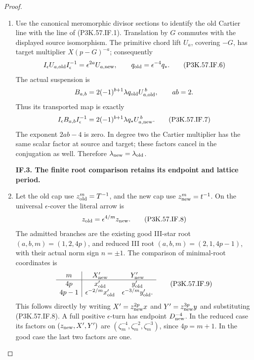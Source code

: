 \begin{proof}
\begin{enumerate}[label=\arabic*.]
\par\medskip\noindent\textbf{IF.2. The complete suspension keeps the scalar.}\par\nopagebreak[4]

\item Use the canonical meromorphic divisor sections to identify the old Cartier
line with the line of (P3K.57.IF.1). Translation by \(G\) commutes with the displayed
source isomorphism. The primitive chord lift \(U_a\), covering \(-G\), has
target multiplier \(X(p-G)^{-a}\); consequently
\[
 I_\epsilon U_{a,\rm old}I_\epsilon^{-1}
       =\epsilon^{2a}U_{a,\rm new},\qquad
 q_{\rm old}=\epsilon^{-4}q_* .                         \tag{P3K.57.IF.6}
\]
The actual suspension is
\[
 B_{a,b}=2(-1)^{b+1}\lambda q_{\rm old}U_{a,\rm old}^{\,b},
 \qquad ab=2 .
\]
Thus its transported map is exactly
\[
 I_\epsilon B_{a,b}I_\epsilon^{-1}
       =2(-1)^{b+1}\lambda q_*U_{a,\rm new}^{\,b}.       \tag{P3K.57.IF.7}
\]
The exponent \(2ab-4\) is zero. In degree two the Cartier multiplier has the
same scalar factor at source and target; these factors cancel in the
conjugation as well. Therefore \(\lambda_{\rm new}=\lambda_{\rm old}\).

\par\medskip\noindent\textbf{IF.3. The finite root comparison retains its endpoint and lattice period.}\par\nopagebreak[4]

\item Let the old cap use \(z_{\rm old}^m=T^{-1}\), and the new cap use
\(z_{\rm new}^m=t^{-1}\). On the universal \(\epsilon\)-cover the literal arrow is
\[
 z_{\rm old}=\epsilon^{4/m}z_{\rm new}.                 \tag{P3K.57.IF.8}
\]
The admitted branches are the existing good III-star root
\((a,b,m)=(1,2,4p)\), and reduced III root
\((a,b,m)=(2,1,4p-1)\), with their actual norm sign \(n=\pm1\).
The comparison of minimal-root coordinates is
\[
 \begin{array}{c|cc}
  m&X'_{\rm new}&Y'_{\rm new}\\ \hline
 4p&x'_{\rm old}&y'_{\rm old}\\
 4p-1&\epsilon^{-2/m}x'_{\rm old}&\epsilon^{-3/m}y'_{\rm old}.
 \end{array}                                           \tag{P3K.57.IF.9}
\]
This follows directly by writing \(X'=z_{\rm new}^{2p}x\) and
\(Y'=z_{\rm new}^{3p}y\) and substituting (P3K.57.IF.8). A full positive
\(\epsilon\)-turn has endpoint \(D_{\rm new}^{-4}\). In the reduced case its
factors on \((z_{\rm new},X',Y')\) are
\((\zeta_m^{-4},\zeta_m^{-2},\zeta_m^{-3})\), since \(4p=m+1\).
In the good case the last two factors are one.


\end{enumerate}
\end{proof}
